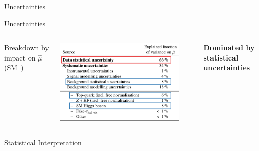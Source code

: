 \documentclass[11pt, xcolor={dvipsnames}, aspectratio=169, notes]{beamer}
\begin{document}

\begin{frame}[standout]
  Uncertainties
\end{frame}


\begin{frame}{Uncertainties}
  \begin{columns}
     \centering

    Breakdown by impact on $\hat{\mu}$ (SM~\HH)

    \vspace*{1.0em}

    \includegraphics[width=0.9\textwidth]{uncertainty_table}


    \textbf{Dominated by statistical uncertainties}
  \end{columns}
\end{frame}


\begin{frame}[standout]
  Statistical Interpretation
\end{frame}

\end{document}
